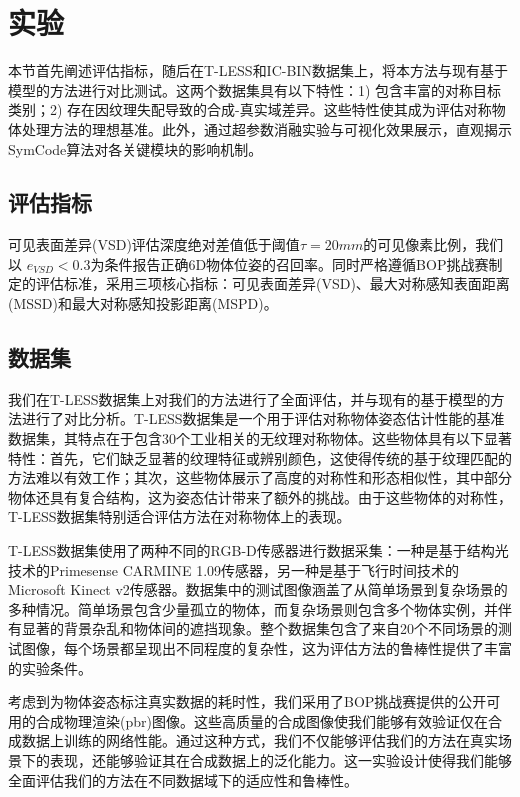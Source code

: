 \section{实验}

本节首先阐述评估指标，随后在T-LESS\cite{tless}和IC-BIN\cite{icbin}数据集上，将本方法与现有基于模型的方法进行对比测试。这两个数据集具有以下特性：1) 包含丰富的对称目标类别；2) 存在因纹理失配导致的合成-真实域差异。这些特性使其成为评估对称物体处理方法的理想基准。此外，通过超参数消融实验与可视化效果展示，直观揭示SymCode算法对各关键模块的影响机制。

\subsection{评估指标}

可见表面差异(VSD)评估深度绝对差值低于阈值$\tau=20mm$的可见像素比例，我们以 $e_{VSD}<0.3$\cite{pitteri2019object}为条件报告正确6D物体位姿的召回率。同时严格遵循BOP挑战赛\cite{hodan2024bop}制定的评估标准，采用三项核心指标：可见表面差异(VSD)、最大对称感知表面距离(MSSD)和最大对称感知投影距离(MSPD)。

\subsection{数据集}

\par 我们在T-LESS数据集\cite{tless}上对我们的方法进行了全面评估，并与现有的基于模型的方法进行了对比分析。T-LESS数据集是一个用于评估对称物体姿态估计性能的基准数据集，其特点在于包含30个工业相关的无纹理对称物体。这些物体具有以下显著特性：首先，它们缺乏显著的纹理特征或辨别颜色，这使得传统的基于纹理匹配的方法难以有效工作；其次，这些物体展示了高度的对称性和形态相似性，其中部分物体还具有复合结构，这为姿态估计带来了额外的挑战。由于这些物体的对称性，T-LESS数据集特别适合评估方法在对称物体上的表现。
\par T-LESS数据集使用了两种不同的RGB-D传感器进行数据采集：一种是基于结构光技术的Primesense CARMINE 1.09传感器，另一种是基于飞行时间技术的Microsoft Kinect v2传感器。数据集中的测试图像涵盖了从简单场景到复杂场景的多种情况。简单场景包含少量孤立的物体，而复杂场景则包含多个物体实例，并伴有显著的背景杂乱和物体间的遮挡现象。整个数据集包含了来自20个不同场景的测试图像，每个场景都呈现出不同程度的复杂性，这为评估方法的鲁棒性提供了丰富的实验条件。
\par 考虑到为物体姿态标注真实数据的耗时性，我们采用了BOP挑战赛\cite{hodan2018bop}提供的公开可用的合成物理渲染(pbr)图像。这些高质量的合成图像使我们能够有效验证仅在合成数据上训练的网络性能。通过这种方式，我们不仅能够评估我们的方法在真实场景下的表现，还能够验证其在合成数据上的泛化能力。这一实验设计使得我们能够全面评估我们的方法在不同数据域下的适应性和鲁棒性。

